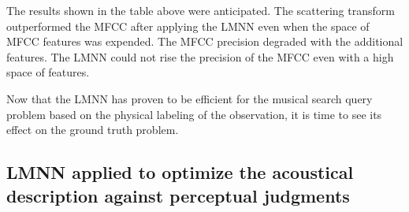 \documentclass[hidelinks,12pt]{report}
\begin{document}
The results shown in the table above were anticipated. The scattering transform outperformed the MFCC after applying the LMNN even when the space of MFCC features was expended. The MFCC precision degraded with the additional features. The LMNN could not rise the precision of the MFCC even with a high space of features.\par 
Now that the LMNN has proven to be efficient for the musical search query problem based on the physical labeling of the observation, it is time to see its effect on the ground truth problem.

\subsection{LMNN applied to optimize the acoustical description against perceptual judgments}
\end{document}
